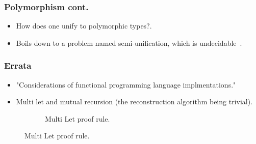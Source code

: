 \documentclass{beamer}
\begin{document}
\begin{frame}
\frametitle{Polymorphism cont.}
    \begin{itemize}
        \item How does one unify to polymorphic types?.
        \item Boils down to a problem named semi-unification, which is undecidable~\cite{WELLS1999111,NAMEHERE}.
    \end{itemize}
\end{frame}

\begin{frame}
\frametitle{Errata}
    \begin{itemize}
        \item "Considerations of functional programming language implmentations."
        \item Multi let and mutual recursion (the reconstruction algorithm being trivial).
    \end{itemize}
    \begin{figure}
    \hspace*{-1.5cm}
    \begin{subfigure}[b]{1\textwidth}
    \begin{prooftree}
    \end{prooftree}
    \caption{Multi Let proof rule.}
    \end{subfigure}
    \end{figure}
\end{frame}

\begin{frame}
    \printbibliography
\end{frame}
\end{document}
